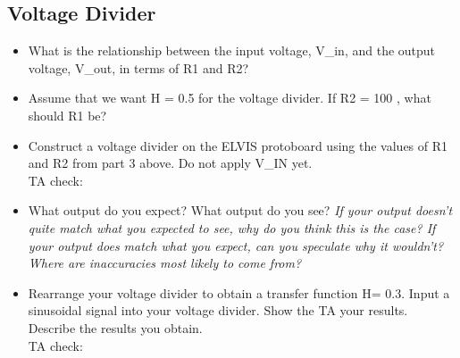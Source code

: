 \documentclass{article}
\begin{document}
\subsection*{Voltage Divider}
\begin{itemize}
	\item What is the relationship between the input voltage, V\_in, and the output voltage, V\_out, in terms of R1 and R2?\vspace{3cm}
	\item Assume that we want H = 0.5 for the voltage divider. If R2 = 100 \textOmega, what should R1 be?\vspace{2cm}
	\item Construct a voltage divider on the ELVIS protoboard using the values of R1 and R2 from part 3 above. Do not apply V\_IN yet.\\TA check: \underline{\hspace{2cm}}
	\item What output do you expect? What output do you see? \textit{If your output doesn’t quite match what you expected to see, why do you think this is the case? If your output does match what you expect, can you speculate why it wouldn’t? Where are inaccuracies most likely to come from?}\vspace{4cm}
	\item Rearrange your voltage divider to obtain a transfer function H= 0.3. Input a sinusoidal signal into your voltage divider. Show the TA your results. Describe the results you obtain.\\TA check: \underline{\hspace{2cm}}
\end{itemize}
\pagebreak
\end{document}
